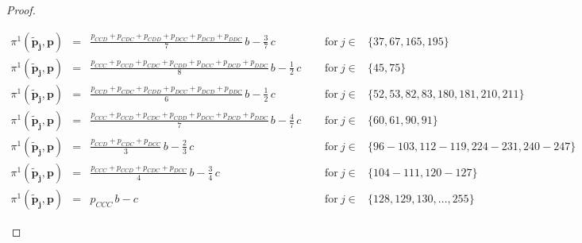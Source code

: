 \documentclass[9pt,twoside,lineno]{pnas-new}
\theoremstyle{plainCl1}
\theoremstyle{plainCl2}
\begin{document}
\begin{proof}
\begin{enumerate}
\begin{equation*}
\begin{array}{lclll}
  \pi^1(\mathbf{\tilde p_j},\mathbf{p}) &= 
  &\displaystyle \frac{p_{CCD} + p_{CDC} + p_{CDD} + p_{DCC} + p_{DCD} + p_{DDC}}{7}\, b - \frac{3}{7} \, c
  &~\text{for}~ j\! \in\! 
  & \{ 37, 67, 165, 195\} \\ [0.2cm]
  
  \pi^1(\mathbf{\tilde p_j},\mathbf{p}) &= 
  &\displaystyle \frac{p_{CCC} + p_{CCD} + p_{CDC} + p_{CDD} + p_{DCC} + p_{DCD} + p_{DDC}}{8} \, b - \frac{1}{2} \, c ~~~~~
  &~\text{for}~ j\! \in\! 
  & \{ 45, 75\} \\ [0.2cm]
  
  \pi^1(\mathbf{\tilde p_j},\mathbf{p}) &= 
  &\displaystyle \frac{p_{CCD}+ p_{CDC}+ p_{CDD}+ p_{DCC}+ p_{DCD}+ p_{DDC}}{6} \, b - \frac{1}{2} \, c
  &~\text{for}~ j\! \in\! 
  & \{ 52, 53, 82, 83, 180, 181, 210, 211\} \\  [0.2cm]
  
  \pi^1(\mathbf{\tilde p_j},\mathbf{p}) &= 
  &\displaystyle \frac{p_{CCC} + p_{CCD} + p_{CDC} + p_{CDD} + p_{DCC} + p_{DCD} + p_{DDC}}{7} \, b - \frac{4}{7} \, c
  &~\text{for}~ j\! \in\! 
  & \{ 60, 61, 90, 91\} \\ [0.2cm]
  
  \pi^1(\mathbf{\tilde p_j},\mathbf{p}) &= 
  &\displaystyle \frac{p_{CCD} + p_{CDC} + p_{DCC}}{3} \, b - \frac{2}{3} \, c
  &~\text{for}~ j\! \in\! 
  & \{ 96\!- \!103, 112\!- \!119, 224\!- \!231, 240\!- \!247\} \\ [0.2cm]
      
  \pi^1(\mathbf{\tilde p_j},\mathbf{p}) &= 
  &\displaystyle \frac{p_{CCC} + p_{CCD} + p_{CDC} + p_{DCC}}{4} \, b - \frac{3}{4} \, c
  &~\text{for}~ j\! \in\! 
  & \{ 104\!-\!111, 120\!- \!127\} \\ [0.2cm]
  
  \pi^1(\mathbf{\tilde p_j},\mathbf{p}) &= 
  &\displaystyle p_{CCC} \, b - c
  &~\text{for}~ j\! \in\! 
  & \{128, 129, 130, \dots, 255\}
  \end{array}
  \end{equation*}
  

\end{enumerate}
\end{proof}
\end{document}
